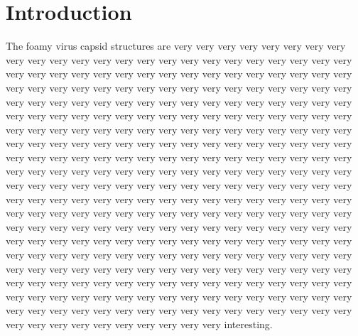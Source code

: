 \section{Introduction}

The foamy virus capsid structures are
very very very very very very very very very very very very very very very very very very very very very very very
very very very very very very very very very very very very very very very very very very very very very very very
very very very very very very very very very very very very very very very very very very very very very very very
very very very very very very very very very very very very very very very very very very very very very very very
very very very very very very very very very very very very very very very very very very very very very very very
very very very very very very very very very very very very very very very very very very very very very very very
very very very very very very very very very very very very very very very very very very very very very very very
very very very very very very very very very very very very very very very very very very very very very very very
very very very very very very very very very very very very very very very very very very very very very very very
very very very very very very very very very very very very very very very very very very very very very very very
very very very very very very very very very very very very very very very very very very very very very very very
very very very very very very very very very very very very very very very very very very very very very very very
very very very very very very very very very very very very very very very very very very very very very very very
very very very very very very very very very very very very very very very very very very very very very very very
interesting.
